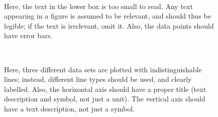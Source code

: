 \documentclass[11pt,a4paper]{article}
\begin{document}
\begin{figure}
  \centering
   \\
  \caption{\small Here, the text in the lower box is too small to
    read.  Any text appearing in a figure is assumed to be relevant,
    and should thus be legible; if the text is irrelevant, omit it.
    Also, the data points should have error bars.}
\end{figure}

\begin{figure}
  \centering
   \\
  \caption{\small Here, three different data sets are plotted with
    indistinguishable lines; instead, different line types should be
    used, and clearly labelled.  Also, the horizontal axis should have
    a proper title (text description and symbol, not just a unit).
    The vertical axis should have a text description, not just a
    symbol.  }
\end{figure}
\end{document}
